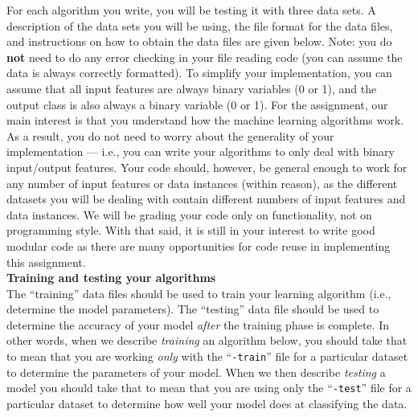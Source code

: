 \documentclass[12pt]{article}
\renewcommand{\(}{\left(}
\renewcommand{\)}{\right)}
\theoremstyle{definition}
\begin{document}
\begin{enumerate}
{{    For each algorithm you write, you will be testing it with three data sets. A description of the data sets you will be using, the file format for the data files, and instructions on how to obtain the data files are given below. Note: you do \textbf{not} need to do any error checking in your file reading code (you can assume the data is always correctly formatted). To simplify your implementation, you can assume that all input features are always binary variables (0 or 1), and the output class is also always a binary variable (0 or 1). For the assignment, our main interest is that you understand how the machine learning algorithms work. As a result, you do not need to worry about the generality of your implementation --- i.e., you can write your algorithms to only deal with binary input/output features. Your code should, however, be general enough to work for any number of input features or data instances (within reason), as the different datasets you will be dealing with contain different numbers of input features and data instances. We will be grading your code only on functionality, not on programming style. With that said, it is still in your interest to write good modular code as there are many opportunities for code reuse in implementing this assignment.\\
    
    \textbf{Training and testing your algorithms}\\
    The ``training'' data files should be used to train your learning algorithm (i.e., determine the model parameters). The ``testing'' data file should be used to determine the accuracy of your model \textit{after} the training phase is complete. In other words, when we describe \textit{training} an algorithm below, you should take that to mean that you are working \textit{only} with the ``\texttt{-train}'' file for a particular dataset to determine the parameters of your model. When we then describe \textit{testing} a model you should take that to mean that you are using only the ``\texttt{-test}'' file for a particular dataset to determine how well your model does at classifying the data.\\
    
}}
\end{enumerate}
\end{document}
